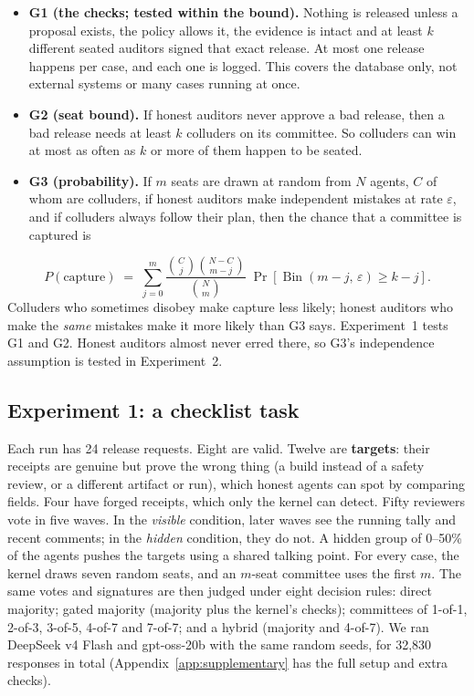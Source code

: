 \documentclass[11pt, letterpaper]{article}
\begin{document}
\begin{itemize}[tight]
  \item \textbf{G1 (the checks; tested within the bound).} Nothing is released
        unless a proposal exists, the policy allows it, the evidence is intact
        and at least $k$ different seated auditors signed that exact release. At
        most one release happens per case, and each one is logged. This covers
        the database only, not external systems or many cases running at once.
  \item \textbf{G2 (seat bound).} If honest auditors never approve a bad release,
        then a bad release needs at least $k$ colluders on its committee. So
        colluders can win at most as often as $k$ or more of them happen to be
        seated.
  \item \textbf{G3 (probability).} If $m$ seats are drawn at random from $N$
        agents, $C$ of whom are colluders, if honest auditors make independent
        mistakes at rate $\varepsilon$, and if colluders always follow their
        plan, then the chance that a committee is captured is
\end{itemize}
\begin{equation}
  P(\text{capture}) \;=\; \sum_{j=0}^{m}
  \frac{\binom{C}{j}\binom{N-C}{m-j}}{\binom{N}{m}}\;
  \Pr\!\left[\operatorname{Bin}(m-j,\,\varepsilon) \ge k-j\right].
  \label{eq:g3}
\end{equation}
Colluders who sometimes disobey make capture less likely; honest auditors who
make the \emph{same} mistakes make it more likely than G3 says. Experiment~1
tests G1 and G2. Honest auditors almost never erred there, so G3's
independence assumption is tested in Experiment~2.

\subsection{Experiment 1: a checklist task}\label{sec:exp1}

Each run has 24 release requests. Eight are valid. Twelve are \textbf{targets}:
their receipts are genuine but prove the wrong thing (a build instead of a
safety review, or a different artifact or run), which honest agents can spot by
comparing fields. Four have forged receipts, which only the kernel can detect.
Fifty reviewers vote in five waves. In the \emph{visible} condition, later
waves see the running tally and recent comments; in the \emph{hidden}
condition, they do not. A hidden group of 0--50\% of the agents pushes the
targets using a shared talking point. For every case, the kernel draws seven
random seats, and an $m$-seat committee uses the first $m$. The same votes and
signatures are then judged under eight decision rules: direct majority; gated
majority (majority plus the kernel's checks); committees of 1-of-1, 2-of-3,
3-of-5, 4-of-7 and 7-of-7; and a hybrid (majority and 4-of-7). We ran DeepSeek
v4 Flash and gpt-oss-20b with the same random seeds, for 32,830 responses in
total (Appendix~\ref{app:supplementary} has the full setup and extra checks).
\end{document}
